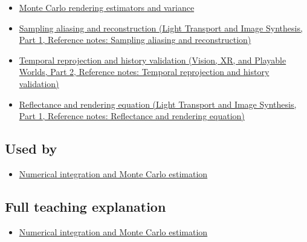 \hypertarget{appendix-68be451b78b1-prerequisites}{}

\begin{itemize}
\tightlist
\item
  \hyperref[appendix-031e02bf28af]{Monte Carlo rendering estimators and variance}
\item
  \href{../04-Light-Transport-and-Image-Synthesis-P01/main.pdf\#appendix-6a7869dd79a6}{Sampling aliasing and reconstruction (Light Transport and Image Synthesis, Part 1, Reference notes: Sampling aliasing and reconstruction)}
\item
  \href{../07-Vision-XR-and-Playable-Worlds-P02/main.pdf\#appendix-0727340a4428}{Temporal reprojection and history validation (Vision, XR, and Playable Worlds, Part 2, Reference notes: Temporal reprojection and history validation)}
\item
  \href{../04-Light-Transport-and-Image-Synthesis-P01/main.pdf\#appendix-96da0b153b77}{Reflectance and rendering equation (Light Transport and Image Synthesis, Part 1, Reference notes: Reflectance and rendering equation)}
\end{itemize}

\subsection{Used by}\label{appendix-68be451b78b1-used-by}

\hypertarget{appendix-68be451b78b1-used-by}{}

\begin{itemize}
\tightlist
\item
  \hyperref[03-visual-computing-i-ch012-numerical-integration-and-monte-carlo-estimation]{Numerical integration and Monte Carlo estimation}
\end{itemize}

\subsection{Full teaching explanation}\label{appendix-68be451b78b1-full-teaching-explanation}

\hypertarget{appendix-68be451b78b1-full-teaching-explanation}{}

\begin{itemize}
\tightlist
\item
  \hyperref[03-visual-computing-i-ch012-numerical-integration-and-monte-carlo-estimation]{Numerical integration and Monte Carlo estimation}
\end{itemize}

